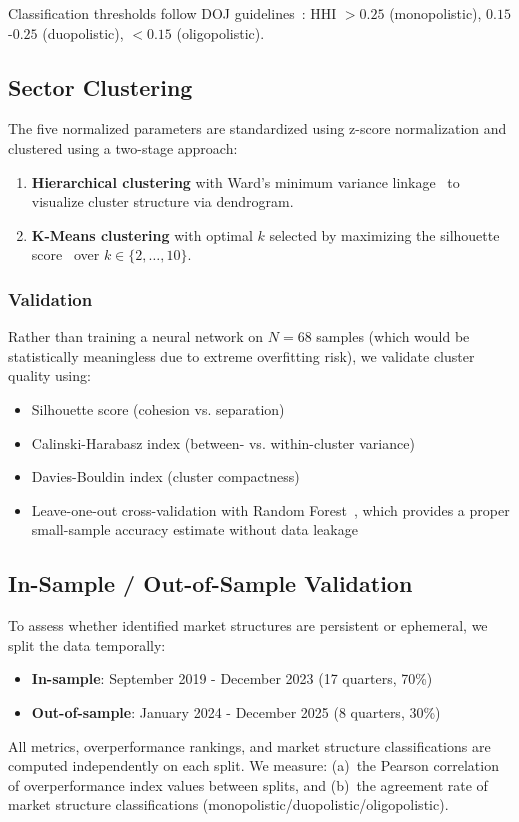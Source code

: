 \documentclass[11pt]{article}
\begin{document}
Classification thresholds follow DOJ guidelines~\cite{doj2010}: HHI $> 0.25$ (monopolistic), $0.15$-$0.25$ (duopolistic), $< 0.15$ (oligopolistic).

\subsection{Sector Clustering}

The five normalized parameters are standardized using z-score normalization and clustered using a two-stage approach:

\begin{enumerate}
    \item \textbf{Hierarchical clustering} with Ward's minimum variance linkage~\cite{ward1963} to visualize cluster structure via dendrogram.
    \item \textbf{K-Means clustering} with optimal $k$ selected by maximizing the silhouette score~\cite{rousseeuw1987} over $k \in \{2, \ldots, 10\}$.
\end{enumerate}

\subsubsection{Validation}
Rather than training a neural network on $N = 68$ samples (which would be statistically meaningless due to extreme overfitting risk), we validate cluster quality using:
\begin{itemize}
    \item Silhouette score (cohesion vs. separation)~\cite{rousseeuw1987}
    \item Calinski-Harabasz index (between- vs. within-cluster variance)
    \item Davies-Bouldin index (cluster compactness)
    \item Leave-one-out cross-validation with Random Forest~\cite{breiman2001}, which provides a proper small-sample accuracy estimate without data leakage
\end{itemize}

\subsection{In-Sample / Out-of-Sample Validation}

To assess whether identified market structures are persistent or ephemeral, we split the data temporally:
\begin{itemize}
    \item \textbf{In-sample}: September 2019 - December 2023 (17 quarters, 70\%)
    \item \textbf{Out-of-sample}: January 2024 - December 2025 (8 quarters, 30\%)
\end{itemize}
All metrics, overperformance rankings, and market structure classifications are computed independently on each split. We measure: (a)~the Pearson correlation of overperformance index values between splits, and (b)~the agreement rate of market structure classifications (monopolistic/duopolistic/oligopolistic).
\end{document}
